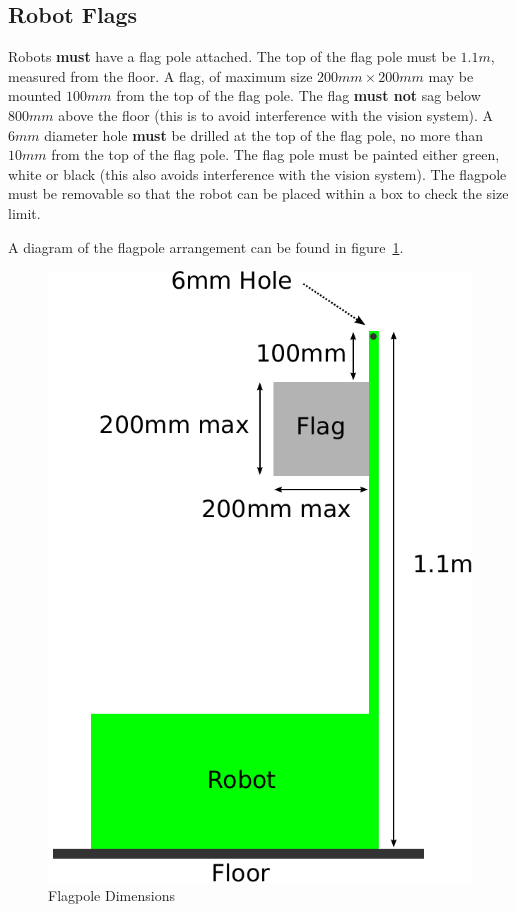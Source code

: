\subsection{Robot Flags}
\label{sec:flags}

Robots \textbf{must} have a flag pole attached.
The top of the flag pole must be $1.1m$, measured from the floor.
A flag, of maximum size $200mm \times 200mm$ may be mounted $100mm$ from the top of the flag pole.
The flag \textbf{must not} sag below $800mm$ above the floor (this is to avoid interference with the vision system).
A $6mm$ diameter hole \textbf{must} be drilled at the top of the flag pole, no more than $10mm$ from the top of the flag pole.
The flag pole must be painted either green, white or black (this also avoids interference with the vision system).
The flagpole must be removable so that the robot can be placed within a box to check the size limit.

A diagram of the flagpole arrangement can be found in figure~\ref{fig:flag}.

\begin{figure}
 \begin{center}
  \includegraphics[keepaspectratio, scale =0.7]{./images/flag-2011.pdf}
  \caption{\label{fig:flag}Flagpole Dimensions}
 \end{center}
\end{figure}
\clearpage
